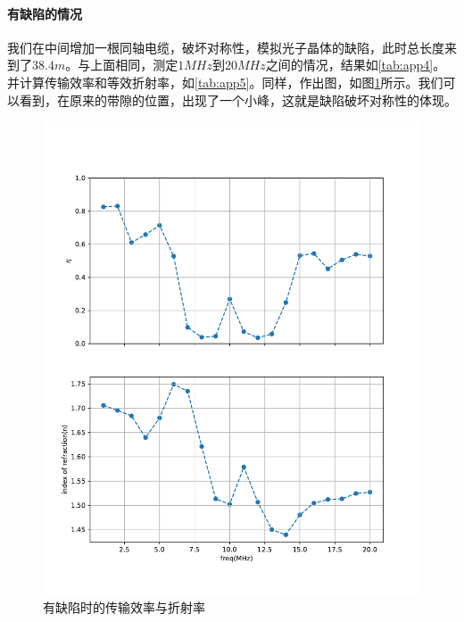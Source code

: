 \documentclass[fleqn,10pt]{SelfArx} %
\begin{document}
\paragraph*{有缺陷的情况} 我们在中间增加一根同轴电缆，破坏对称性，模拟光子晶体的缺陷，此时总长度来到了$38.4m$。与上面相同，测定$1MHz$到$20MHz$之间的情况，结果如\ref{tab:app4}。并计算传输效率和等效折射率，如\ref{tab:app5}。同样，作出图，如图\ref{fig:a3}所示。我们可以看到，在原来的带隙的位置，出现了一个小峰，这就是缺陷破坏对称性的体现。
\begin{figure}[htbp]
	\centering
	\includegraphics[width=\linewidth]{C4-eta-n.pdf}
	\caption{有缺陷时的传输效率与折射率}
	\label{fig:a3}
\end{figure}
\end{document}
